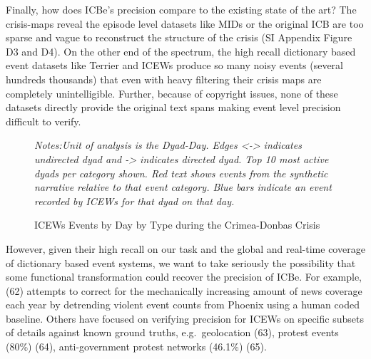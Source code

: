 \documentclass[9pt,twocolumn,twoside,lineno]{pnas-new}
\begin{document}
Finally, how does ICBe's precision compare to the existing state of the
art? The crisis-maps reveal the episode level datasets like MIDs or the
original ICB are too sparse and vague to reconstruct the structure of
the crisis (SI Appendix Figure D3 and D4). On the other end of the
spectrum, the high recall dictionary based event datasets like Terrier
and ICEWs produce so many noisy events (several hundreds thousands) that
even with heavy filtering their crisis maps are completely
unintelligible. Further, because of copyright issues, none of these
datasets directly provide the original text spans making event level
precision difficult to verify.

\begin{figure}
\caption{ ICEWs Events by Day by Type during the Crimea-Donbas Crisis \label{fig:p_precision_icews}}
\textit{Notes:Unit of analysis is the Dyad-Day. Edges <-> indicates undirected dyad and -> indicates directed dyad. Top 10 most active dyads per category shown. Red text shows events from the synthetic narrative relative to that event category. Blue bars indicate an event recorded by ICEWs for that dyad on that day. }
\end{figure}

However, given their high recall on our task and the global and
real-time coverage of dictionary based event systems, we want to take
seriously the possibility that some functional transformation could
recover the precision of ICBe. For example, (62) attempts to correct for
the mechanically increasing amount of news coverage each year by
detrending violent event counts from Phoenix using a human coded
baseline. Others have focused on verifying precision for ICEWs on
specific subsets of details against known ground truths,
e.g.~geolocation (63), protest events (80\%) (64), anti-government
protest networks (46.1\%) (65).
\end{document}
